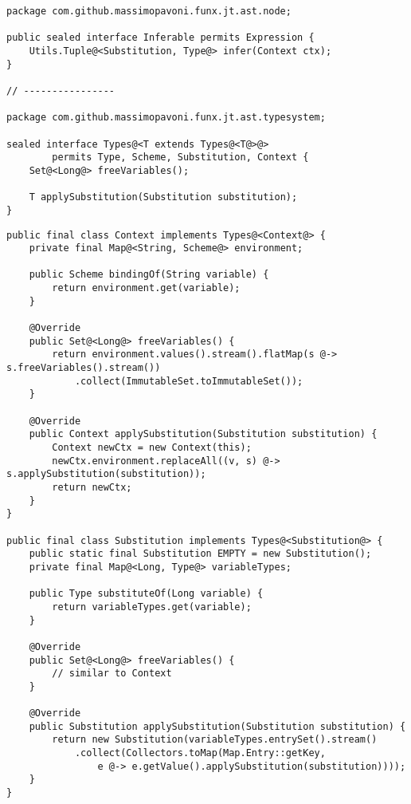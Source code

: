 \begin{lstlisting}[caption={Interfacce utili nel \textit{sistema HM}}, style=javaCode, label={lst:5-hm-interfaces-java}]
package com.github.massimopavoni.funx.jt.ast.node;

public sealed interface Inferable permits Expression {
    Utils.Tuple@<Substitution, Type@> infer(Context ctx);
}

// ----------------

package com.github.massimopavoni.funx.jt.ast.typesystem;

sealed interface Types@<T extends Types@<T@>@>
        permits Type, Scheme, Substitution, Context {
    Set@<Long@> freeVariables();

    T applySubstitution(Substitution substitution);
}
\end{lstlisting}
\vspace{4mm}
\begin{lstlisting}[caption={Altre classi del \textit{sistema HM}}, style=javaCode, label={lst:5-hm-more-classes-java}]
public final class Context implements Types@<Context@> {
    private final Map@<String, Scheme@> environment;

    public Scheme bindingOf(String variable) {
        return environment.get(variable);
    }

    @Override
    public Set@<Long@> freeVariables() {
        return environment.values().stream().flatMap(s @-> s.freeVariables().stream())
            .collect(ImmutableSet.toImmutableSet());
    }

    @Override
    public Context applySubstitution(Substitution substitution) {
        Context newCtx = new Context(this);
        newCtx.environment.replaceAll((v, s) @-> s.applySubstitution(substitution));
        return newCtx;
    }
}

public final class Substitution implements Types@<Substitution@> {
    public static final Substitution EMPTY = new Substitution();
    private final Map@<Long, Type@> variableTypes;

    public Type substituteOf(Long variable) {
        return variableTypes.get(variable);
    }

    @Override
    public Set@<Long@> freeVariables() {
        // similar to Context
    }

    @Override
    public Substitution applySubstitution(Substitution substitution) {
        return new Substitution(variableTypes.entrySet().stream()
            .collect(Collectors.toMap(Map.Entry::getKey,
                e @-> e.getValue().applySubstitution(substitution))));
    }
}
\end{lstlisting}